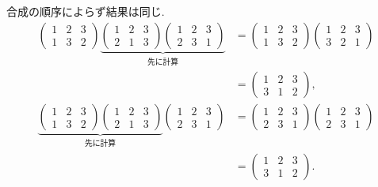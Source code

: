 \documentclass[11pt, a4paper, dvipdfmx]{jsarticle}
\theoremstyle{definition}
\theoremstyle{mystyle}
\numberwithin{equation}{section} %
\begin{document}
合成の順序によらず結果は同じ. 
\begin{align*}
    \begin{pmatrix}
        1 & 2 & 3\\
        1 & 3 & 2
    \end{pmatrix}
    \underbrace{
    \begin{pmatrix}
        1 & 2 & 3\\
        2 & 1 & 3
    \end{pmatrix}
    \begin{pmatrix}
        1 & 2 & 3\\
        2 & 3 & 1
    \end{pmatrix}
    }_{\text{先に計算}}
    &=
    \begin{pmatrix}
        1 & 2 & 3\\
        1 & 3 & 2
    \end{pmatrix}
    \begin{pmatrix}
        1 & 2 & 3\\
        3 & 2 & 1
    \end{pmatrix}\\
    &= 
    \begin{pmatrix}
        1 & 2 & 3\\
        3 & 1 & 2
    \end{pmatrix},
\end{align*}
\begin{align*}
    \underbrace{
    \begin{pmatrix}
        1 & 2 & 3\\
        1 & 3 & 2
    \end{pmatrix}
    \begin{pmatrix}
        1 & 2 & 3\\
        2 & 1 & 3
    \end{pmatrix}
    }_{\text{先に計算}}
    \begin{pmatrix}
        1 & 2 & 3\\
        2 & 3 & 1
    \end{pmatrix}
    &=
    \begin{pmatrix}
        1 & 2 & 3\\
        2 & 3 & 1
    \end{pmatrix}
    \begin{pmatrix}
        1 & 2 & 3\\
        2 & 3 & 1
    \end{pmatrix}\\
    &= 
    \begin{pmatrix}
        1 & 2 & 3\\
        3 & 1 & 2
    \end{pmatrix}.
\end{align*}
\end{document}
